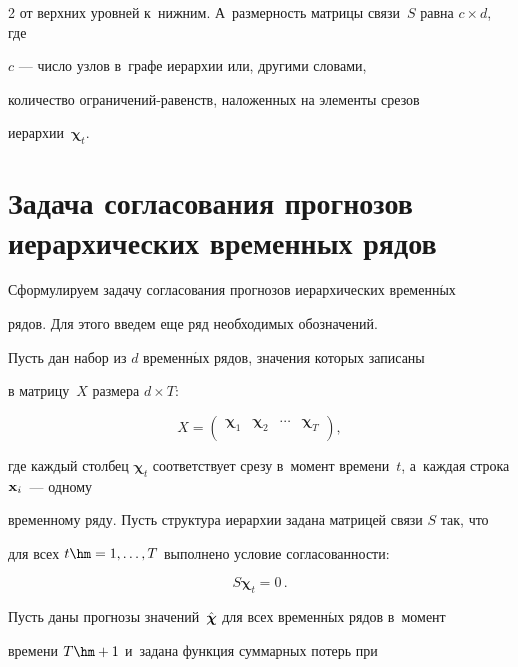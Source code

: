 \begin{multicols}{2}
от верхних уровней к~нижним. А~размерность матрицы связи~$S$ равна $c \times d$, где

$c$ --- число узлов в~графе иерархии или, другими словами,

количество огра\-ни\-че\-ний-ра\-венств, наложенных на элементы срезов

иерархии~$\boldsymbol{\chi}_t$.







\section{Задача согласования прогнозов иерархических временных рядов}



Сформулируем задачу согласования прогнозов иерархических временн$\acute{\mbox{ы}}$х

рядов. Для этого введем еще ряд необходимых обозначений.



Пусть дан набор из $d$ временн$\acute{\mbox{ы}}$х рядов, значения которых записаны

в матрицу~$X$ размера $d \times T$:

$$

    X = \left(%

\begin{array}{cccc}

  \boldsymbol{\chi}_1 & \boldsymbol{\chi}_2 & \cdots & \boldsymbol{\chi}_T \\

\end{array}%

\right),

$$

где каждый столбец $\boldsymbol{\chi}_t$ соответствует срезу в~момент времени~$t$, а~каждая строка $\mathbf{x}_i$~--- одному

временному ряду. Пусть структура иерархии задана матрицей связи $S$ так, что

для всех $t \hm= 1, \ldots ,T$ выполнено условие согласованности:

$$

    S \boldsymbol{\chi}_t = 0\,.

$$

Пусть даны прогнозы  значений~$\hat{\boldsymbol{\chi}}$ для всех временн$\acute{\mbox{ы}}$х рядов в~момент

времени $T\hm + 1$ и~задана функция суммарных потерь при


\end{multicols}

